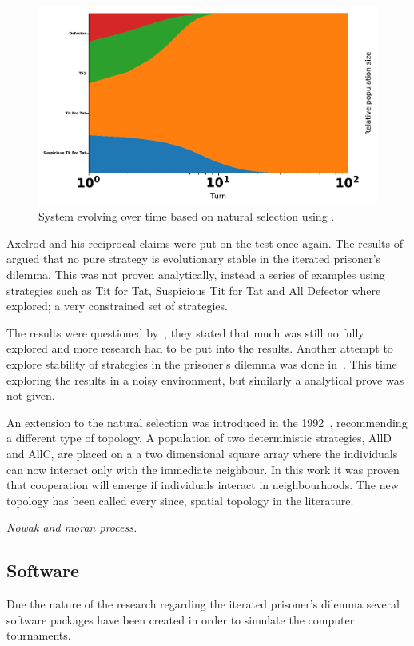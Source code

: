 \documentclass{article}
\begin{document}
\begin{figure}[!hbtp]
    \centering
    \includegraphics[width=.6\textwidth]{./assets/images/ecological.pdf}
    \caption{System evolving over time based on natural selection using
    \cite{axelrodproject}.}
    \label{fig:ecological.tournament}
\end{figure}

Axelrod and his reciprocal claims were put on the test once again. 
The results of~\cite{Boyd1987} argued that no pure strategy is evolutionary
stable in the iterated prisoner's dilemma. This was not proven analytically, instead
a series of examples using strategies such as Tit for Tat, Suspicious
Tit for Tat and All Defector where explored; a very constrained set of strategies.

The results were questioned by~\cite{May1987}, they stated that much was 
still no fully explored and more research had to be put into the results. 
Another attempt to explore stability of strategies in the prisoner's dilemma
was done in~\cite{Boyd1989}. This time exploring the results in a noisy
environment, but similarly a analytical prove was not given.

An extension to the natural selection was introduced in the 1992~\cite{Nowak1992},
recommending a different type of topology. A population of two deterministic
strategies, AllD and AllC, are placed on a a two dimensional square array
where the individuals can now interact only with the immediate neighbour. 
In this work it was proven that cooperation will emerge if individuals interact
in neighbourhoods. The new topology has been called every since, spatial 
topology in the literature. %

\textit{Nowak and moran process.} 

\subsection{Software} 

Due the nature of the research regarding the iterated prisoner's dilemma
several software packages have been created in order to simulate the 
computer tournaments.
\end{document}
